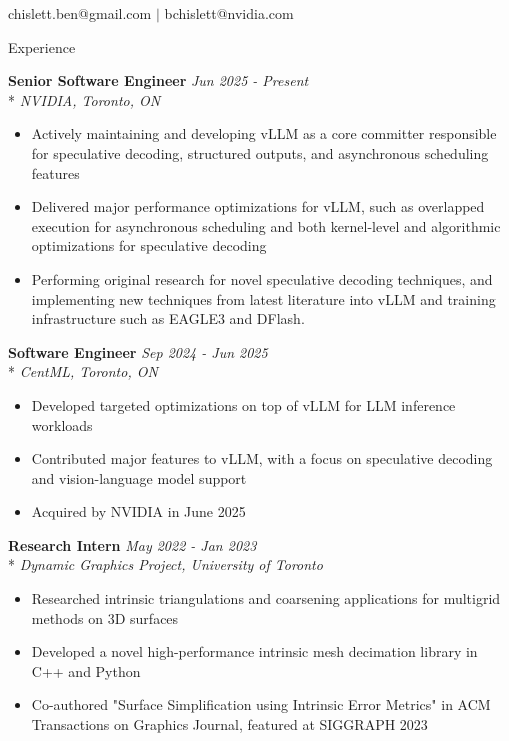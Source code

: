 \documentclass[11pt, letterpaper]{article}
\title{}
\author{Benjamin Chislett}
\date{}
\begin{document}
\begin{center}
  \Huge\theauthor
  \par
  \vspace{1mm}
  \large{chislett.ben@gmail.com} $|$ \large{bchislett@nvidia.com}
  \par

\end{center}

\begin{section}{Experience}

\textbf{Senior Software Engineer}
\hfill
\textit{Jun 2025 - Present}\\*
\textit{NVIDIA, Toronto, ON}
\begin{itemize}
  \item Actively maintaining and developing vLLM as a core committer responsible for speculative decoding, structured outputs, and asynchronous scheduling features
  \item Delivered major performance optimizations for vLLM, such as overlapped execution for asynchronous scheduling and both kernel-level and algorithmic optimizations for speculative decoding
  \item Performing original research for novel speculative decoding techniques, and implementing new techniques from latest literature into vLLM and training infrastructure such as EAGLE3 and DFlash. \\
\end{itemize}

\textbf{Software Engineer}
\hfill
\textit{Sep 2024 - Jun 2025}\\*
\textit{CentML, Toronto, ON}
\begin{itemize}
  \item Developed targeted optimizations on top of vLLM for LLM inference workloads
  \item Contributed major features to vLLM, with a focus on speculative decoding and vision-language model support
  \item Acquired by NVIDIA in June 2025 \\
\end{itemize}

\textbf{Research Intern}
\hfill
\textit{May 2022 - Jan 2023}\\*
\textit{Dynamic Graphics Project, University of Toronto}
\begin{itemize}
  \item Researched intrinsic triangulations and coarsening applications for multigrid methods on 3D surfaces
  \item Developed a novel high-performance intrinsic mesh decimation library in C++ and Python
  \item Co-authored "Surface Simplification using Intrinsic Error Metrics" in ACM Transactions on Graphics Journal, featured at SIGGRAPH 2023 \\
\end{itemize}


\end{section}
\end{document}
